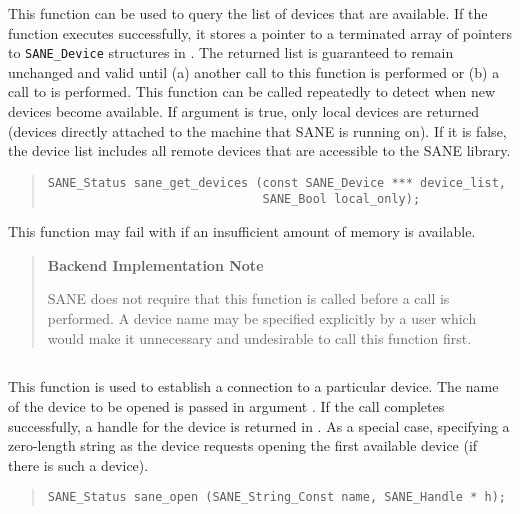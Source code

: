 \documentclass[11pt,DVIps]{report}
\begin{document}
This function can be used to query the list of devices that are
available.  If the function executes successfully, it stores a pointer
to a  terminated array of pointers to \verb|SANE_Device|
structures in .  The returned list is guaranteed
to remain unchanged and valid until (a) another call to this function
is performed or (b) a call to  is performed.  This
function can be called repeatedly to detect when new devices become
available.  If argument  is true, only local devices
are returned (devices directly attached to the machine that SANE is
running on).  If it is false, the device list includes all remote
devices that are accessible to the SANE library.
\begin{quote}
\begin{verbatim}
SANE_Status sane_get_devices (const SANE_Device *** device_list,
                              SANE_Bool local_only);
\end{verbatim}
\end{quote}

This function may fail with  if an
insufficient amount of memory is available.

\begin{quote}
  \begin{center}
    {\bf Backend Implementation Note}
  \end{center}
  SANE does not require that this function is called before a
   call is performed.  A device name may be
  specified explicitly by a user which would make it unnecessary and
  undesirable to call this function first.
\end{quote}


\subsection{}

This function is used to establish a connection to a particular
device.  The name of the device to be opened is passed in argument
.  If the call completes successfully, a handle for the
device is returned in .  As a special case, specifying a
zero-length string as the device requests opening the first available
device (if there is such a device).
\begin{quote}
\begin{verbatim}
SANE_Status sane_open (SANE_String_Const name, SANE_Handle * h);
\end{verbatim}
\end{quote}
\end{document}
